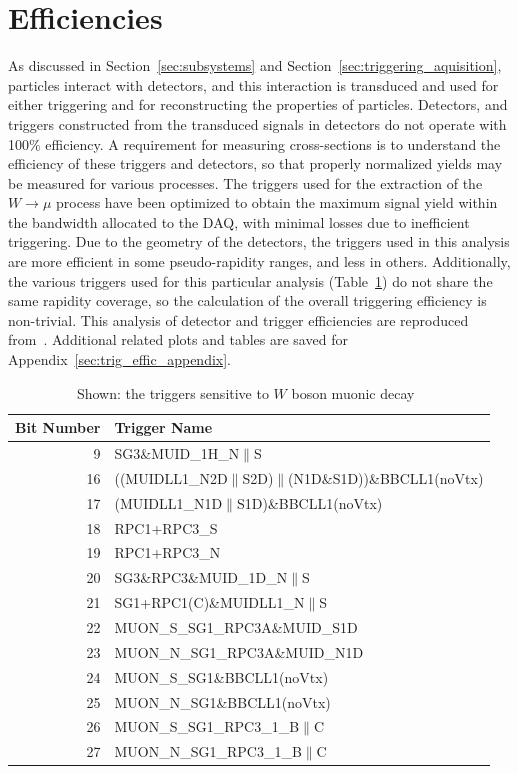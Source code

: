 \clearpage
\section{Efficiencies}
\label{sec:efficiencies}

As discussed in Section~\ref{sec:subsystems} and
Section~\ref{sec:triggering_aquisition}, particles interact with detectors, and
this interaction is transduced and used for either triggering and for
reconstructing the properties of particles. Detectors, and triggers constructed
from the transduced signals in detectors do not operate with 100\% efficiency.
A requirement for measuring cross-sections is to understand the efficiency of
these triggers and detectors, so that properly normalized yields may be measured
for various processes. The triggers used for the extraction of the
$W\rightarrow\mu$ process have been optimized to obtain the maximum signal yield
within the bandwidth allocated to the DAQ, with minimal losses due to
inefficient triggering. Due to the geometry of the detectors, the triggers used
in this analysis are more efficient in some pseudo-rapidity ranges, and less in
others. Additionally, the various triggers used for this particular analysis
(Table~\ref{tab:w_triggers}) do not share the same rapidity coverage, so the
calculation of the overall triggering efficiency is non-trivial. This analysis
of detector and trigger efficiencies are reproduced from~\cite{Seidl2014}.
Additional related plots and tables are saved for
Appendix~\ref{sec:trig_effic_appendix}.

\begin{table}[ht]
  \centering
  \begin{tabular}{r l}
    \toprule
    \textbf{Bit Number} & \textbf{Trigger Name} \\ 
    \midrule
    9 & SG3\&MUID\_1H\_N$\|$S\\
    16 & ((MUIDLL1\_N2D$\|$S2D)$\|$(N1D\&S1D))\&BBCLL1(noVtx)\\
    17 & (MUIDLL1\_N1D$\|$S1D)\&BBCLL1(noVtx)\\
    18 & RPC1+RPC3\_S\\
    19 & RPC1+RPC3\_N\\
    20 & SG3\&RPC3\&MUID\_1D\_N$\|$S\\
    21 & SG1+RPC1(C)\&MUIDLL1\_N$\|$S\\
    22 & MUON\_S\_SG1\_RPC3A\&MUID\_S1D\\
    23 & MUON\_N\_SG1\_RPC3A\&MUID\_N1D\\
    24 & MUON\_S\_SG1\&BBCLL1(noVtx)\\
    25 & MUON\_N\_SG1\&BBCLL1(noVtx)\\
    26 & MUON\_S\_SG1\_RPC3\_1\_B$\|$C\\
    27 & MUON\_N\_SG1\_RPC3\_1\_B$\|$C\\ 
    \bottomrule
  \end{tabular}
  \caption{Shown: the triggers sensitive to $W$ boson muonic
  decay~\cite{Seidl2014} }
  \label{tab:w_triggers}
\end{table}
\clearpage

